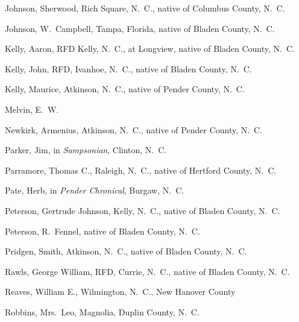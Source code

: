 \documentclass[11pt, a5paper]{book}
\begin{document}
\begin{thebibliography}{99}
  Johnson, Sherwood, Rich Square, N.~C., native of Columbus County, N.~C.

  Johnson, W.~Campbell, Tampa, Florida, native of Bladen County, N.~C.

  Kelly, Aaron, RFD Kelly, N.~C., at Longview, native of Bladen County, N.~C.

  Kelly, John, RFD, Ivanhoe, N.~C., native of Bladen County, N.~C.

  Kelly, Maurice, Atkinson, N.~C., native of Pender County, N.~C.

  Melvin, E.~W.

  Newkirk, Armenius, Atkinson, N.~C., native of Pender County, N.~C.

  Parker, Jim, in \textit{Sampsonian}, Clinton, N.~C.

  Parramore, Thomas C., Raleigh, N.~C., native of Hertford County, N.~C.

  Pate, Herb, in \textit{Pender Chronical}, Burgaw, N.~C.

  Peterson, Gertrude Johnson, Kelly, N.~C., native of Bladen County, N.~C.

  Peterson, R.~Fennel, native of Bladen County, N.~C.

  Pridgen, Smith, Atkinson, N.~C., native of Bladen County, N.~C.

  Rawls, George William, RFD, Currie, N.~C., native of Bladen County, N.~C.

  Reaves, William E., Wilmington, N.~C., New Hanover County

  Robbins, Mrs.~Leo, Magnolia, Duplin County, N.~C.


\end{thebibliography}
\end{document}
